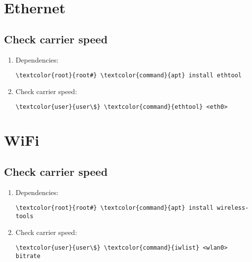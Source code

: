 \documentclass[10pt, a4paper, onecolumn, openany]{book} %
\begin{document}
\section{Ethernet}
\subsection{Check carrier speed}
\begin{enumerate}
    \item Dependencies:
\begin{Verbatim}[commandchars=\\\{\}]
\textcolor{root}{root#} \textcolor{command}{apt} install ethtool
\end{Verbatim}
    \item Check carrier speed:
\begin{Verbatim}[commandchars=\\\{\}]
\textcolor{user}{user\$} \textcolor{command}{ethtool} <eth0>
\end{Verbatim}
\end{enumerate}
\section{WiFi}
\subsection{Check carrier speed}
\begin{enumerate}
    \item Dependencies:
\begin{Verbatim}[commandchars=\\\{\}]
\textcolor{root}{root#} \textcolor{command}{apt} install wireless-tools
\end{Verbatim}
    \item Check carrier speed:
\begin{Verbatim}[commandchars=\\\{\}]
\textcolor{user}{user\$} \textcolor{command}{iwlist} <wlan0> bitrate
\end{Verbatim}
\end{enumerate}
\end{document}
